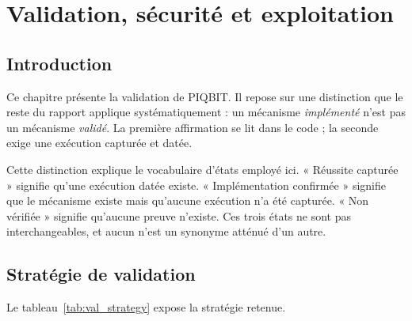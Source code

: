 %
\chapter{Validation, sécurité et exploitation}
\label{chap:validation}

\section{Introduction}
\label{sec:val_intro}

Ce chapitre présente la validation de PIQBIT. Il repose sur une distinction
que le reste du rapport applique systématiquement : un mécanisme
\emph{implémenté} n'est pas un mécanisme \emph{validé}. La première affirmation
se lit dans le code ; la seconde exige une exécution capturée et datée.

Cette distinction explique le vocabulaire d'états employé ici. « Réussite
capturée » signifie qu'une exécution datée existe. « Implémentation
confirmée » signifie que le mécanisme existe mais qu'aucune exécution n'a été
capturée. « Non vérifiée » signifie qu'aucune preuve n'existe. Ces trois états
ne sont pas interchangeables, et aucun n'est un synonyme atténué d'un autre.

\section{Stratégie de validation}
\label{sec:test_strategy}

Le tableau~\ref{tab:val_strategy} expose la stratégie retenue.


